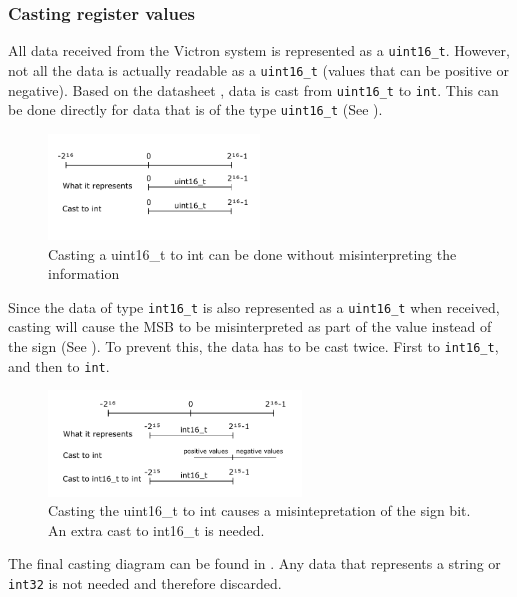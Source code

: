 \subsubsection{Casting register values}\label{sec:casting}
All data received from the Victron system is represented as a \verb|uint16_t|. However, not all the data is actually readable as a \verb|uint16_t| (values that can be positive or negative). Based on the datasheet \cite{excel_registers}, data is cast from \verb|uint16_t| to \verb|int|. This can be done directly for data that is of the type \verb|uint16_t| (See ).\\

\begin{figure}[!ht]
  \centering
    \includegraphics[width=0.5\textwidth]{images/Cast_voorbeeld_uint16_t.pdf}
      \caption{Casting a uint16\_t to int can be done without misinterpreting the information}\label{fig:uint16_t}
\end{figure}

Since the data of type \verb|int16_t| is also represented as a \verb|uint16_t| when received, casting will cause the MSB to be misinterpreted as part of the value instead of the sign (See ). To prevent this, the data has to be cast twice. First to \verb|int16_t|, and then to \verb|int|.\\

\begin{figure}[!ht]
  \centering
    \includegraphics[width=0.6\textwidth]{images/Cast_voorbeeld_int16_t.pdf}
      \caption{Casting the uint16\_t to int causes a misintepretation of the sign bit. An extra cast to int16\_t is needed.}\label{fig:int16_t}
\end{figure}

The final casting diagram can be found in . Any data that represents a string or \verb|int32| is not needed and therefore discarded.\\


